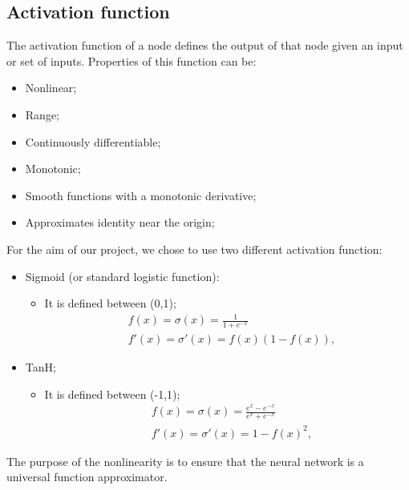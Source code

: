 \subsection{Activation function}
\label{activationFunction}
The activation function of a node defines the output of that node given an input or set of inputs. 
Properties of this function can be:
\begin{itemize}
	\item Nonlinear;
	\item Range;
	\item Continuously differentiable;
	\item Monotonic;
	\item Smooth functions with a monotonic derivative;
	\item Approximates identity near the origin;
\end{itemize}

For the aim of our project, we chose to use two different activation function:
\begin{itemize}
	\label{sigmoid}
	\item Sigmoid (or standard logistic function):
	\begin{itemize}
		\item It is defined between (0,1); 		
			\begin{align*}
			&f(x) = \sigma(x) = \frac{1}{1 + e^{-x}} \\
			&f'(x) = \sigma'(x) = f(x)(1 - f(x)),
			\end{align*} 
	\end{itemize}
	\item TanH;
	\label{tanH}
	\begin{itemize}
		\item It is defined between (-1,1); 		
		\begin{align*}
		&f(x) = \sigma(x) = \frac{e^{x}-e^{-x}}{e^{x} + e^{-x}} \\
		&f'(x) = \sigma'(x) = 1 - f(x)^{2},
		\end{align*} 
	\end{itemize}
\end{itemize}
The purpose of the nonlinearity is to ensure that the neural network is a universal function approximator.
